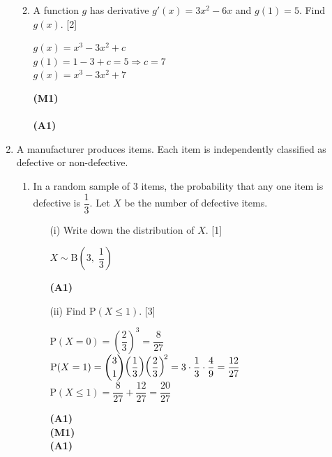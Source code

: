 \documentclass[12pt, twoside]{article}
\begin{document}
\begin{enumerate}[itemsep=0.2cm]
\begin{enumerate}[itemsep=0.3cm]
  \medskip
  \item A function $g$ has derivative $g'(x) = 3x^2 - 6x$ and
        $g(1) = 5$. Find $g(x)$. \hfill [2]

  \begin{minipage}[t]{0.62\textwidth}
  $g(x) = x^3 - 3x^2 + c$\\[0.15cm]
  $g(1) = 1 - 3 + c = 5 \Rightarrow c = 7$\\[0.15cm]
  $g(x) = x^3 - 3x^2 + 7$
  \end{minipage}%
  \begin{minipage}[t]{0.35\textwidth}\raggedleft
  \textbf{(M1)}\\[0.15cm]
  ~\\[0.15cm]
  \textbf{(A1)}
  \end{minipage}
\end{enumerate}

\newpage

\item A manufacturer produces items. Each item is independently classified as
defective or non-defective.

\begin{enumerate}[itemsep=0.3cm]
  \item In a random sample of 3 items, the probability that any one item is
        defective is $\dfrac{1}{3}$. Let $X$ be the number of defective items.
  \begin{enumerate}[itemsep=0.2cm]
    \item[(i)] Write down the distribution of $X$. \hfill [1]

    \begin{minipage}[t]{0.62\textwidth}
    $X \sim \mathrm{B}\!\left(3,\; \dfrac{1}{3}\right)$
    \end{minipage}%
    \begin{minipage}[t]{0.35\textwidth}\raggedleft
    \textbf{(A1)}
    \end{minipage}

    \medskip
    \item[(ii)] Find $\mathrm{P}(X \leq 1)$. \hfill [3]

    \begin{minipage}[t]{0.62\textwidth}
    $\mathrm{P}(X = 0) = \left(\dfrac{2}{3}\right)^{\!3} = \dfrac{8}{27}$\\[0.3cm]
    $\mathrm{P}(X = 1) = \dbinom{3}{1}\!\left(\dfrac{1}{3}\right)\!\left(\dfrac{2}{3}\right)^{\!2}
      = 3 \cdot \dfrac{1}{3} \cdot \dfrac{4}{9} = \dfrac{12}{27}$\\[0.3cm]
    $\mathrm{P}(X \leq 1) = \dfrac{8}{27} + \dfrac{12}{27} = \dfrac{20}{27}$
    \end{minipage}%
    \begin{minipage}[t]{0.35\textwidth}\raggedleft
    \textbf{(A1)}\\[0.3cm]
    \textbf{(M1)}\\[0.3cm]
    \textbf{(A1)}
    \end{minipage}
  \end{enumerate}


\end{enumerate}
\end{enumerate}
\end{document}
